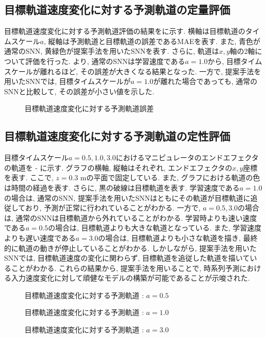 \subsection{目標軌道速度変化に対する予測軌道の定量評価}
目標軌道速度変化に対する予測軌道評価の結果をに示す.
横軸は目標軌道のタイムスケール$a$, 縦軸は予測軌道と目標軌道の誤差であるMAEを表す.
また, 青色が通常のSNN, 黄緑色が提案手法を用いたSNNを表す.
さらに, 軌道は$x, y$軸の2軸について評価を行った.
より, 通常のSNNは学習速度である$a=1.0$から, 目標タイムスケールが離れるほど, その誤差が大きくなる結果となった.
一方で, 提案手法を用いたSNNでは, 目標タイムスケールが$a=1.0$が離れた場合であっても, 通常のSNNと比較して, その誤差が小さい値を示した.
\begin{figure}[htb]
    \centering
    
    \caption{目標軌道速度変化に対する予測軌道誤差}
    \label{fig:result3:2}
\end{figure}


\subsection{目標軌道速度変化に対する予測軌道の定性評価}
目標タイムスケール$a=0.5, 1.0, 3.0$におけるマニピュレータのエンドエフェクタの軌道を - に示す.
グラフの横軸, 縦軸はそれぞれ, エンドエフェクタの$x, y$座標を表す.
ここで, $z=0.3$ mの平面で固定している.
また, グラフにおける軌道の色は時間の経過を表す.
さらに, 黒の破線は目標軌道を表す.
学習速度である$a=1.0$の場合は, 通常のSNN, 提案手法を用いたSNNはともにその軌道が目標軌道に追従しており, 予測が正常に行われていることがわかる.
一方で, $a=0.5, 3.0$の場合は, 通常のSNNは目標軌道から外れていることがわかる.
学習時よりも速い速度である$a=0.5$の場合は, 目標軌道よりも大きな軌道となっている.
また, 学習速度よりも遅い速度である$a=3.0$の場合は, 目標軌道よりも小さな軌道を描き, 最終的に軌道の動きが停止していることがわかる.
しかしながら, 提案手法を用いたSNNでは, 目標軌道速度の変化に関わらず, 目標軌道を追従した軌道を描いていることがわかる.
これらの結果から, 提案手法を用いることで, 時系列予測における入力速度変化に対して頑健なモデルの構築が可能であることが示唆された.
\begin{figure}[htb]
    \centering
    
    \caption{目標軌道速度変化に対する予測軌道 : $a=0.5$}
    \label{fig:result3:3:a0.5}
\end{figure}

\begin{figure}[htb]
    \centering
    
    \caption{目標軌道速度変化に対する予測軌道 : $a=1.0$}
    \label{fig:result3:3:a1.0}
\end{figure}

\begin{figure}[htb]
    \centering
    
    \caption{目標軌道速度変化に対する予測軌道 : $a=3.0$}
    \label{fig:result3:3:a3.0}
\end{figure}


